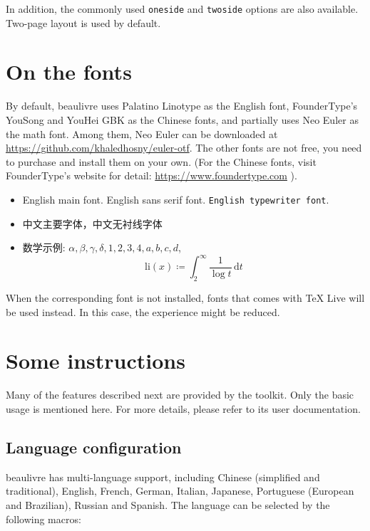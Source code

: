 \documentclass[allowbf,puretext]{beaulivre}
\theoremstyle{basic}
\theoremstyle{emphasis}
\theoremstyle{simple}
\newenvironment{tip}[1][Tip]{%
    \begin{tcolorbox}[breakable,
        enhanced,
        width = \textwidth,
        colback = paper, colbacktitle = paper,
        colframe = gray!50, boxrule=0.2mm,
        coltitle = black,
        fonttitle = \sffamily,
        attach boxed title to top left = {yshift=-\tcboxedtitleheight/2, xshift=.5cm},
        boxed title style = {boxrule=0pt, colframe=paper},
        before skip = 0.3cm,
        after skip = 0.3cm,
        top = 3mm,
        bottom = 3mm,
        title={\scshape\sffamily #1}]%
}{\end{tcolorbox}}
\providecommand{\beaulivre}{{\normalfont\textsf{beaulivre}}}
\begin{document}
\bigskip
In addition, the commonly used \texttt{oneside} and \texttt{twoside} options are also available. Two-page layout is used by default.

\chapter{On the fonts}
By default, \beaulivre{} uses Palatino Linotype as the English font, FounderType's YouSong and YouHei GBK as the Chinese fonts, and partially uses Neo Euler as the math font. Among them, Neo Euler can be downloaded at \url{https://github.com/khaledhosny/euler-otf}. The other fonts are not free, you need to purchase and install them on your own. (For the Chinese fonts, visit FounderType's website for detail: \url{https://www.foundertype.com} ).

\medskip
\begin{tip}[Font demonstration]
    \begin{itemize}
        \item English main font. \textsf{English sans serif font}. \texttt{English typewriter font}.
        \item 中文主要字体，\textsf{中文无衬线字体}
        \item 数学示例:  \( \alpha, \beta, \gamma, \delta, 1,2,3,4, a,b,c,d \), \[\mathrm{li}(x)\coloneqq \int_2^{\infty} \frac{1}{\log t}\,\mathrm{d}t \]
    \end{itemize}
\end{tip}

\bigskip
When the corresponding font is not installed, fonts that comes with TeX Live will be used instead. In this case, the experience might be reduced.


\chapter{Some instructions}

Many of the features described next are provided by the \ProjLib{} toolkit. Only the basic usage is mentioned here. For more details, please refer to its user documentation.

\section{Language configuration}

\beaulivre{} has multi-language support, including Chinese (simplified and traditional), English, French, German, Italian, Japanese, Portuguese (European and Brazilian), Russian and Spanish. The language can be selected by the following macros:
\end{document}
